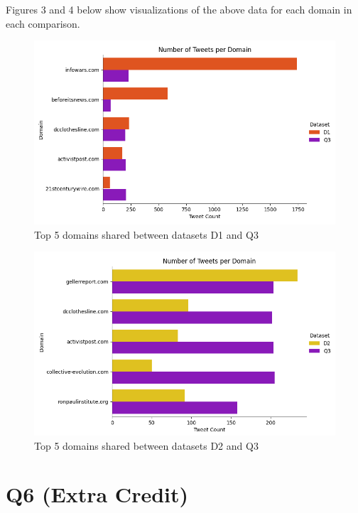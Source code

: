 \documentclass[12pt]{article}
\begin{document}
Figures 3 and 4 below show visualizations of the above data for each domain in each comparison.

\begin{figure}[H]
            \centering
            \includegraphics[scale=0.8,trim = 9 0 0 0, clip]{Q4_D1Q3_Graph.png}
            \caption{Top 5 domains shared between datasets D1 and Q3}
            \label{fig:my_label}
        \end{figure}
        
\begin{figure}[H]
            \centering
            \includegraphics[scale=0.8,trim = 9 0 0 0, clip]{Q4_D2Q3_Graph.png}
            \caption{Top 5 domains shared between datasets D2 and Q3}
            \label{fig:my_label}
        \end{figure}

\section*{Q6 (Extra Credit)}
\end{document}
